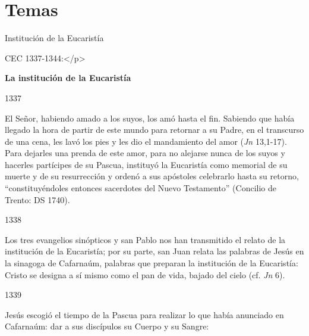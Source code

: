 			\section{Temas}
			
			\begin{ccetheme}Institución de la Eucaristía \end{ccetheme}
			
			\begin{ccereference}\end{ccereference}CEC 1337-1344:</p>
			
			\begin{ccebody}\textbf{La institución de la Eucaristía}\end{ccebody}
			
			\begin{ccebody}\begin{ccenumber}1337\end{ccenumber} El Señor, habiendo amado a los suyos, los amó hasta el fin. Sabiendo que había llegado la hora de partir de este mundo para retornar a su Padre, en el transcurso de una cena, les lavó los pies y les dio el mandamiento del amor (\textit{Jn} 13,1-17). Para dejarles una prenda de este amor, para no alejarse nunca de los suyos y hacerles partícipes de su Pascua, instituyó la Eucaristía como memorial de su muerte y de su resurrección y ordenó a sus apóstoles celebrarlo hasta su retorno, “constituyéndoles entonces sacerdotes del Nuevo Testamento” (Concilio de Trento: DS 1740).\end{ccebody}
			
			\begin{ccebody}\begin{ccenumber}1338\end{ccenumber} Los tres evangelios sinópticos y san Pablo nos han transmitido el relato de la institución de la Eucaristía; por su parte, san Juan relata las palabras de Jesús en la sinagoga de Cafarnaúm, palabras que preparan la institución de la Eucaristía: Cristo se designa a sí mismo como el pan de vida, bajado del cielo (cf. \textit{Jn} 6).\end{ccebody}
			
			\begin{ccebody}\begin{ccenumber}1339 \end{ccenumber}Jesús escogió el tiempo de la Pascua para realizar lo que había anunciado en Cafarnaúm: dar a sus discípulos su Cuerpo y su Sangre:\end{ccebody}
			
